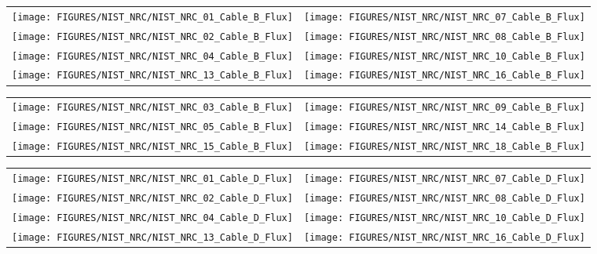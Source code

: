 \newpage

\begin{figure}[p]
\begin{tabular*}{\textwidth}{l@{\extracolsep{\fill}}r}
\texttt{[image: FIGURES/NIST\_NRC/NIST\_NRC\_01\_Cable\_B\_Flux]} &
\texttt{[image: FIGURES/NIST\_NRC/NIST\_NRC\_07\_Cable\_B\_Flux]} \\
\texttt{[image: FIGURES/NIST\_NRC/NIST\_NRC\_02\_Cable\_B\_Flux]} &
\texttt{[image: FIGURES/NIST\_NRC/NIST\_NRC\_08\_Cable\_B\_Flux]} \\
\texttt{[image: FIGURES/NIST\_NRC/NIST\_NRC\_04\_Cable\_B\_Flux]} &
\texttt{[image: FIGURES/NIST\_NRC/NIST\_NRC\_10\_Cable\_B\_Flux]} \\
\texttt{[image: FIGURES/NIST\_NRC/NIST\_NRC\_13\_Cable\_B\_Flux]} &
\texttt{[image: FIGURES/NIST\_NRC/NIST\_NRC\_16\_Cable\_B\_Flux]}
\end{tabular*}
\label{NIST_NRC_Cable_B_Flux_Closed}
\end{figure}

\begin{figure}[p]
\begin{tabular*}{\textwidth}{l@{\extracolsep{\fill}}r}
\texttt{[image: FIGURES/NIST\_NRC/NIST\_NRC\_03\_Cable\_B\_Flux]} &
\texttt{[image: FIGURES/NIST\_NRC/NIST\_NRC\_09\_Cable\_B\_Flux]} \\
\texttt{[image: FIGURES/NIST\_NRC/NIST\_NRC\_05\_Cable\_B\_Flux]} &
\texttt{[image: FIGURES/NIST\_NRC/NIST\_NRC\_14\_Cable\_B\_Flux]} \\
\texttt{[image: FIGURES/NIST\_NRC/NIST\_NRC\_15\_Cable\_B\_Flux]} &
\texttt{[image: FIGURES/NIST\_NRC/NIST\_NRC\_18\_Cable\_B\_Flux]}
\end{tabular*}
\label{NIST_NRC_Cable_B_Flux_Open}
\end{figure}

\begin{figure}[p]
\begin{tabular*}{\textwidth}{l@{\extracolsep{\fill}}r}
\texttt{[image: FIGURES/NIST\_NRC/NIST\_NRC\_01\_Cable\_D\_Flux]} &
\texttt{[image: FIGURES/NIST\_NRC/NIST\_NRC\_07\_Cable\_D\_Flux]} \\
\texttt{[image: FIGURES/NIST\_NRC/NIST\_NRC\_02\_Cable\_D\_Flux]} &
\texttt{[image: FIGURES/NIST\_NRC/NIST\_NRC\_08\_Cable\_D\_Flux]} \\
\texttt{[image: FIGURES/NIST\_NRC/NIST\_NRC\_04\_Cable\_D\_Flux]} &
\texttt{[image: FIGURES/NIST\_NRC/NIST\_NRC\_10\_Cable\_D\_Flux]} \\
\texttt{[image: FIGURES/NIST\_NRC/NIST\_NRC\_13\_Cable\_D\_Flux]} &
\texttt{[image: FIGURES/NIST\_NRC/NIST\_NRC\_16\_Cable\_D\_Flux]}
\end{tabular*}
\label{NIST_NRC_Cable_D_Flux_Closed}
\end{figure}

